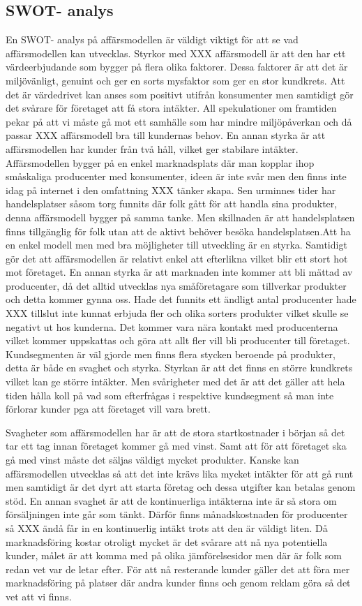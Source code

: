 \documentclass[10pt,a4paper,oneside]{article}
\begin{document}
\subsection{SWOT- analys}
En SWOT- analys på affärsmodellen är väldigt viktigt för att se vad affärsmodellen kan utvecklas. Styrkor med XXX affärsmodell är att den har ett värdeerbjudande som bygger på flera olika faktorer. Dessa faktorer är att det är miljövänligt, genuint och ger en sorts mysfaktor som ger en stor kundkrets. Att det är värdedrivet kan anses som positivt utifrån konsumenter men samtidigt gör det svårare för företaget att få stora intäkter. All spekulationer om framtiden pekar på att vi måste gå mot ett samhälle som har mindre miljöpåverkan och då passar XXX affärsmodell bra till kundernas behov. En annan styrka är att affärsmodellen har kunder från två håll, vilket ger stabilare intäkter. Affärsmodellen bygger på en enkel marknadsplats där man kopplar ihop småskaliga producenter med konsumenter, ideen är inte svår men den finns inte idag på internet i den omfattning XXX tänker skapa. Sen urminnes tider har handelsplatser såsom torg funnits där folk gått för att handla sina produkter, denna affärsmodell bygger på samma tanke. Men skillnaden är att handelsplatsen finns tillgänglig för folk utan att de aktivt behöver besöka handelsplatsen.Att ha en enkel modell men med bra möjligheter till utveckling är en styrka. Samtidigt gör det att affärsmodellen är relativt enkel att efterlikna vilket blir ett stort hot mot företaget.  En annan styrka är att marknaden inte kommer att bli mättad av producenter, då det alltid utvecklas nya småföretagare som tillverkar produkter och detta kommer gynna oss. Hade det funnits ett ändligt antal producenter hade XXX tillslut inte kunnat erbjuda fler och olika sorters produkter vilket skulle se negativt ut hos kunderna. Det kommer vara nära kontakt med producenterna vilket kommer uppskattas och göra att allt fler vill bli producenter till företaget. Kundsegmenten är väl gjorde men finns flera stycken beroende på produkter, detta är både en svaghet och styrka. Styrkan är att det finns en större kundkrets vilket kan ge större intäkter. Men svårigheter med det är att det gäller att hela tiden hålla koll på vad som efterfrågas i respektive kundsegment så man inte förlorar kunder pga att företaget vill vara brett. 

Svagheter som affärsmodellen har är att de stora startkostnader i början så det tar ett tag innan företaget kommer gå med vinst. Samt att för att företaget ska gå med vinst måste det säljas väldigt mycket produkter. Kanske kan affärsmodellen utvecklas så att det inte krävs lika mycket intäkter för att gå runt men samtidigt är det dyrt att starta företag och dessa utgifter kan betalas genom stöd. En annan svaghet är att de kontinuerliga intäkterna inte är så stora om försäljningen inte går som tänkt. Därför finns månadskostnaden för producenter så XXX ändå får in en kontinuerlig intäkt trots att den är väldigt liten. Då marknadsföring kostar otroligt mycket är det svårare att nå nya potentiella kunder, målet är att komma med på olika jämförelsesidor men där är folk som redan vet var de letar efter. För att nå resterande kunder gäller det att föra mer marknadsföring på platser där andra kunder finns och genom reklam göra så det vet att vi finns. 
\end{document}

